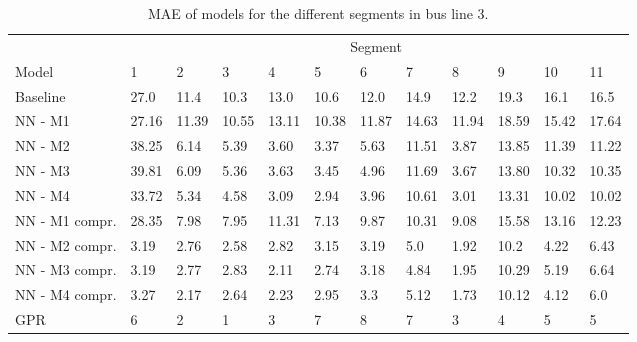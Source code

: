\begin{table}[H]
  \centering
  \caption{MAE of models for the different segments in bus line 3.}
  \label{tbl:model-mae-of-segs-203}
  \begin{tabular}{ l | l | l | l | l | l | l | l | l | l | l | l }
    & \multicolumn{11}{c}{Segment} \\
    Model       & 1 & 2 & 3 & 4 & 5 & 6 & 7 & 8 & 9 & 10 & 11 \\
    \hline
    Baseline  & 27.0 & 11.4 & 10.3 & 13.0 & 10.6 & 12.0 & 14.9 & 12.2 & 19.3 & 16.1  & 16.5 \\
    NN - M1         & 27.16& 11.39& 10.55& 13.11& 10.38& 11.87& 14.63& 11.94& 18.59& 15.42& 17.64\\
    NN - M2         & 38.25 & 6.14 & 5.39 & 3.60 &  3.37 & 5.63 &  11.51 & 3.87 & 13.85 & 11.39  & 11.22\\
    NN - M3         & 39.81 & 6.09 & 5.36 & 3.63 &  3.45 & 4.96 &  11.69 & 3.67 & 13.80 & 10.32  & 10.35\\
    NN - M4         & 33.72 & 5.34 & 4.58 & 3.09 & 2.94 & 3.96 &  10.61 & 3.01 & 13.31 & 10.02  & 10.02\\
    NN - M1 compr.         & 28.35& 7.98& 7.95& 11.31& 7.13& 9.87& 10.31& 9.08& 15.58& 13.16& 12.23 \\ 
    NN - M2 compr.         & 3.19& 2.76& 2.58& 2.82& 3.15& 3.19& 5.0& 1.92& 10.2& 4.22& 6.43 \\
    NN - M3 compr.         & 3.19& 2.77& 2.83& 2.11& 2.74& 3.18& 4.84& 1.95& 10.29& 5.19& 6.64 \\
    NN - M4 compr.         & 3.27& 2.17& 2.64& 2.23& 2.95& 3.3& 5.12& 1.73& 10.12& 4.12& 6.0 \\
    GPR         & 6 & 2 & 1 & 3 &  7 & 8 &  7 & 3 & 4 & 5  & 5 \\
  \end{tabular}
\end{table}

